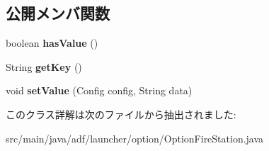 \subsection*{公開メンバ関数}
\begin{DoxyCompactItemize}
\item 
\hypertarget{classadf_1_1launcher_1_1option_1_1OptionFireStation_ab50dda3cb829d8e0c108cfbc87b29a3f}{}\label{classadf_1_1launcher_1_1option_1_1OptionFireStation_ab50dda3cb829d8e0c108cfbc87b29a3f} 
boolean {\bfseries has\+Value} ()
\item 
\hypertarget{classadf_1_1launcher_1_1option_1_1OptionFireStation_a5abc3eb7e6f919d19718b2c18828dda6}{}\label{classadf_1_1launcher_1_1option_1_1OptionFireStation_a5abc3eb7e6f919d19718b2c18828dda6} 
String {\bfseries get\+Key} ()
\item 
\hypertarget{classadf_1_1launcher_1_1option_1_1OptionFireStation_a154335cd5a612b4f28a1c2ca3ddff50f}{}\label{classadf_1_1launcher_1_1option_1_1OptionFireStation_a154335cd5a612b4f28a1c2ca3ddff50f} 
void {\bfseries set\+Value} (Config config, String data)
\end{DoxyCompactItemize}


このクラス詳解は次のファイルから抽出されました\+:\begin{DoxyCompactItemize}
\item 
src/main/java/adf/launcher/option/Option\+Fire\+Station.\+java\end{DoxyCompactItemize}
